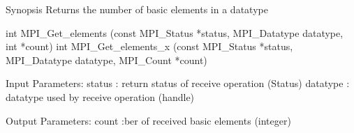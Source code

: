 Synopsis
Returns the number of basic elements in a datatype

int MPI_Get_elements
    (const MPI_Status *status, MPI_Datatype datatype, int *count)
int MPI_Get_elements_x
    (const MPI_Status *status, MPI_Datatype datatype, MPI_Count *count)

Input Parameters:
status : return status of receive operation (Status) 
datatype : datatype used by receive operation (handle) 

Output Parameters:
count :ber of received basic elements (integer)
